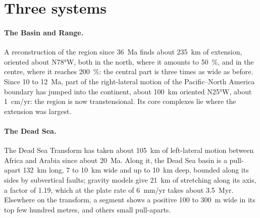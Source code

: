 \begin{omfigure}
\par{}\label{fig:b3:extension-strike-slip:strike-slip}
\end{omfigure}

\section{Three systems}\label{sec:b3:extension-strike-slip:systems}

\paragraph{The Basin and Range.} A reconstruction of the region since
\qty{36}{Ma} finds about \qty{235}{km} of extension, oriented about
N\ang{78}W, both in the north, where it amounts to \qty{50}{\percent}, and in
the centre, where it reaches \qty{200}{\percent}: the central part is three
times as wide as before. Since 10 to \qty{12}{Ma}, part of the right-lateral
motion of the Pacific--North America boundary has jumped into the continent,
about \qty{100}{km} oriented N\ang{25}W, about \qty{1}{cm/yr}: the region is
now transtensional. Its core complexes lie where the extension was largest.

\paragraph{The Dead Sea.} The Dead Sea Transform has taken about
\qty{105}{km} of left-lateral motion between Africa and Arabia since about
\qty{20}{Ma}. Along it, the Dead Sea basin is a pull-apart \qty{132}{km}
long, 7 to \qty{10}{km} wide and up to \qty{10}{km} deep, bounded along its
sides by subvertical faults; gravity models give \qty{21}{km} of stretching
along its axis, a factor of 1.19, which at the plate rate of
\qty{6}{mm/yr} takes about \qty{3.5}{Myr}. Elsewhere on the transform, a
segment shows a positive  100 to \qty{300}{m} wide in its top
few hundred metres, and others small pull-aparts.

